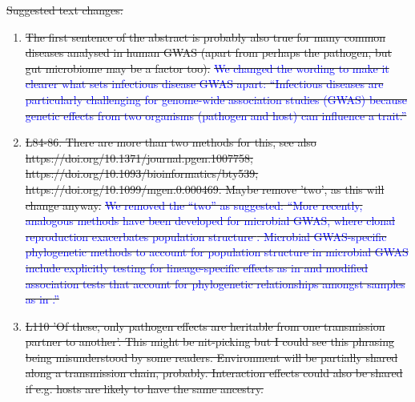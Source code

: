 \documentclass[12pt]{article} %
\providecommand{\DIFdel}[1]{{\protect\color{red}\sout{#1}}}                      %
\begin{document}

\DIFdel{Suggested text changes:
}%

\begin{enumerate}%
\item%
\DIFdel{The first sentence of the abstract is probably also true for many common diseases analysed in human GWAS (apart from perhaps the pathogen, but gut microbiome may be a factor too). }%
\DIFdel{\textcolor{blue}{We changed the wording to make it clearer what sets infectious disease GWAS apart: ``Infectious diseases are particularly challenging for genome-wide association studies (GWAS) because genetic effects from two organisms (pathogen and host) can influence a trait.''}
    }%
\item%
\DIFdel{L84-86. There are more than two methods for this, see also https://doi.org/10.1371/journal.pgen.1007758; https://doi.org/10.1093/bioinformatics/bty539; https://doi.org/10.1099/mgen.0.000469. Maybe remove 'two', as this will change anyway.}%
\DIFdel{\textcolor{blue}{We removed the ``two'' as suggested: ``More recently, analogous methods have been developed for microbial GWAS, where clonal reproduction exacerbates population structure \citep{Power2017}. Microbial GWAS-specific phylogenetic methods to account for population structure in microbial GWAS include explicitly testing for lineage-specific effects as in \citep{Earle2016} and modified association tests that account for phylogenetic relationships amongst samples as in \citep{collins_phylogenetic_nodate}.''}
    }%
\item%
\DIFdel{L110 'Of these, only pathogen effects are heritable from one transmission partner to another'. This might be nit-picking but I could see this phrasing being misunderstood by some readers. Environment will be partially shared along a transmission chain, probably. Interaction effects could also be shared if e.g. hosts are likely to have the same ancestry.}%

\end{enumerate}
\end{document}
